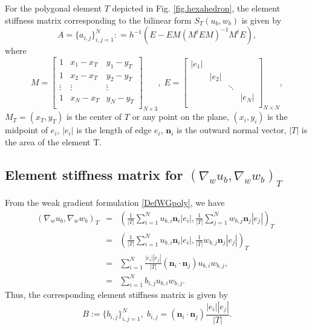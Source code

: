 \documentclass[final,leqno]{siamltex704}
\begin{document}
\begin{theorem}
For the polygonal element $T$ depicted in Fig. \ref{fig.hexahedron}, the element stiffness matrix corresponding to the bilinear form $S_T(u_b,w_b)$ is given by
\begin{equation}\label{EQ:element-stiffness-matrix-S}
A=\{a_{i,j}\}_{i,j=1}^N: = h^{-1}(E- EM(M^tEM)^{-1}M^tE),
\end{equation}
where
\begin{equation*}
M=
\begin{bmatrix}
1      & x_{1} - x_T & y_{1} - y_T\\
1      & x_{2} - x_T & y_{2} - y_T\\
\vdots & \vdots        & \vdots       \\
1      & x_{N} - x_T & y_{N} - y_T\\
\end{bmatrix}_{N\times3},\;
E=
\begin{bmatrix}
|e_1| &       &           &       \\  %
      & |e_2| &           &       \\
      &       & \ddots    &       \\
      &       &           & |e_N| \\
\end{bmatrix}_{N\times N},
\end{equation*}
$M_T=(x_T,y_T)$ is the center of $T$ or any point on the plane, $(x_i, y_i)$ is the midpoint of $e_i$, $|e_i|$ is the length of edge $e_i$, $\bm{n}_i$ is the outward normal vector,  $|T|$ is the area of the element T.
\end{theorem}

\subsection{Element stiffness matrix for $(\nabla_w u_b,\nabla_w w_b)_T$} From the weak gradient formulation \eqref{DefWGpoly}, we have
\begin{eqnarray}
(\nabla_w u_b,\nabla_w w_b )_T
&=&(\displaystyle\frac{1}{|T|}\sum_{i=1}^N u_{b,i}\bm{n}_i|e_i|,\displaystyle\frac{1}{|T|}\sum_{j=1}^N w_{b,j}\bm{n}_j|e_j|)_{T}~~\label{equ.SM.2}\\
&=&(\displaystyle\frac{1}{|T|}\sum_{i=1}^N u_{b,i}\bm{n}_i|e_i|,\displaystyle\frac{1}{|T|} w_{b,j}\bm{n}_j|e_j|)_{T} \nonumber\\
&=&\sum_{i=1}^N \frac{|e_i||e_j|}{|T|}(\bm{n}_i\cdot\bm{n}_j) u_{b,i}w_{b,j},\nonumber \\
&=&\sum_{i=1}^N b_{i,j}u_{b,i}w_{b,j}.\nonumber
\end{eqnarray}
Thus, the corresponding element stiffness matrix is given by
\begin{equation}\label{EQ:element-stiffness-matrix-G}
B:=\{b_{i,j}\}_{i,j=1}^N,\; b_{i,j} = (\bm{n}_i\cdot\bm{n}_j)\displaystyle\frac{|e_i||e_j|}{|T|}.
\end{equation}
\end{document}
